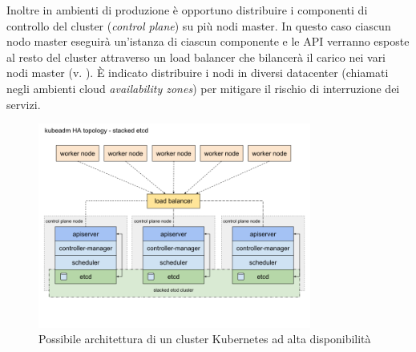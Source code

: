 \documentclass[12pt,a4paper,openright,twoside]{book}
\begin{document}
Inoltre in ambienti di produzione è opportuno distribuire i componenti di controllo del cluster (\textit{control plane}) su più nodi master. In questo caso ciascun nodo master eseguirà un'istanza
di ciascun componente e le API verranno esposte al resto del cluster attraverso un load balancer che bilancerà il carico nei vari nodi master (v. ). È indicato distribuire i nodi in diversi datacenter 
(chiamati negli ambienti cloud \textit{availability zones}) per mitigare il rischio di interruzione dei servizi\cite{kubernetes}.
%
\begin{figure}[!hbt]
    \centering
    \includegraphics[width=0.8\textwidth]{figures/kube-ha-topo.png}
    \caption{Possibile architettura di un cluster Kubernetes ad alta disponibilità}
    \label{fig:kube-ha-topo}
\end{figure}
%
\end{document}

